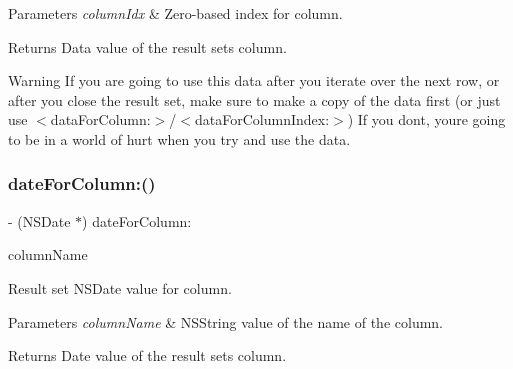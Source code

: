 \begin{DoxyParams}{Parameters}
{\em column\+Idx} & Zero-\/based index for column.\\
\hline
\end{DoxyParams}
\begin{DoxyReturn}{Returns}
Data value of the result set\textquotesingle{}s column.
\end{DoxyReturn}
\begin{DoxyWarning}{Warning}
If you are going to use this data after you iterate over the next row, or after you close the result set, make sure to make a copy of the data first (or just use {\ttfamily $<$data\+For\+Column\+:$>$}/{\ttfamily $<$data\+For\+Column\+Index\+:$>$}) If you don\textquotesingle{}t, you\textquotesingle{}re going to be in a world of hurt when you try and use the data. 
\end{DoxyWarning}
\mbox{\label{interface_o_p_t_l_y_f_m_d_b_result_set_a2896eb3784b41a2408744c77f78512f5}} 
\subsubsection{\texorpdfstring{date\+For\+Column\+:()}{dateForColumn:()}}
{\footnotesize\ttfamily -\/ (N\+S\+Date $\ast$) date\+For\+Column\+: \begin{DoxyParamCaption}\item[{(N\+S\+String$\ast$)}]{column\+Name }\end{DoxyParamCaption}}

Result set {\ttfamily N\+S\+Date} value for column.


\begin{DoxyParams}{Parameters}
{\em column\+Name} & {\ttfamily N\+S\+String} value of the name of the column.\\
\hline
\end{DoxyParams}
\begin{DoxyReturn}{Returns}
Date value of the result set\textquotesingle{}s column. 
\end{DoxyReturn}
\mbox{\label{interface_o_p_t_l_y_f_m_d_b_result_set_ae5c24425fd6b0f63bb7cec97f26dc8ed}} 
